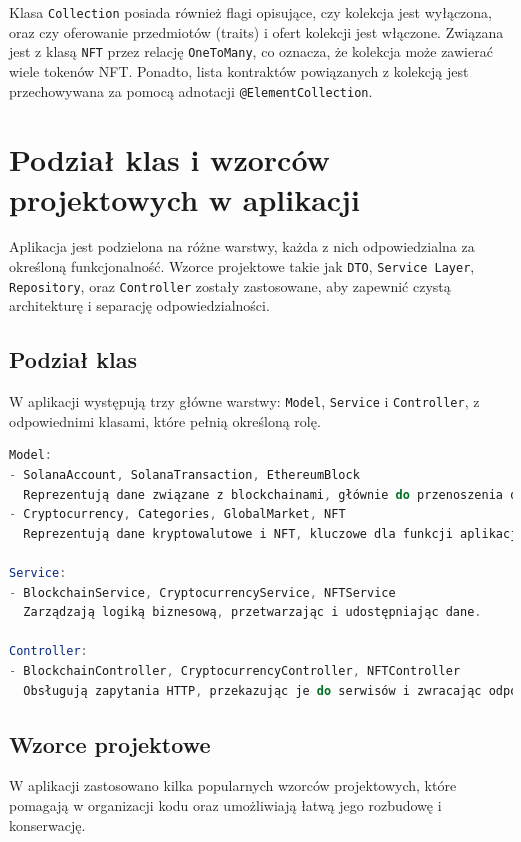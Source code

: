 Klasa \texttt{Collection} posiada również flagi opisujące, czy kolekcja jest wyłączona, oraz czy oferowanie przedmiotów (traits) i ofert kolekcji jest włączone. Związana jest z klasą \texttt{NFT} przez relację \texttt{OneToMany}, co oznacza, że kolekcja może zawierać wiele tokenów NFT. Ponadto, lista kontraktów powiązanych z kolekcją jest przechowywana za pomocą adnotacji \texttt{@ElementCollection}.

\section{Podział klas i wzorców projektowych w aplikacji}

Aplikacja jest podzielona na różne warstwy, każda z nich odpowiedzialna za określoną funkcjonalność. Wzorce projektowe takie jak \texttt{DTO}, \texttt{Service Layer}, \texttt{Repository}, oraz \texttt{Controller} zostały zastosowane, aby zapewnić czystą architekturę i separację odpowiedzialności.

\subsection{Podział klas}

W aplikacji występują trzy główne warstwy: \texttt{Model}, \texttt{Service} i \texttt{Controller}, z odpowiednimi klasami, które pełnią określoną rolę.

\begin{lstlisting}[language=Java, caption={Podział klas w aplikacji}]
Model:
- SolanaAccount, SolanaTransaction, EthereumBlock
  Reprezentują dane związane z blockchainami, głównie do przenoszenia danych.
- Cryptocurrency, Categories, GlobalMarket, NFT
  Reprezentują dane kryptowalutowe i NFT, kluczowe dla funkcji aplikacji.

Service:
- BlockchainService, CryptocurrencyService, NFTService
  Zarządzają logiką biznesową, przetwarzając i udostępniając dane.

Controller:
- BlockchainController, CryptocurrencyController, NFTController
  Obsługują zapytania HTTP, przekazując je do serwisów i zwracając odpowiedzi.
\end{lstlisting}


\subsection{Wzorce projektowe}

W aplikacji zastosowano kilka popularnych wzorców projektowych, które pomagają w organizacji kodu oraz umożliwiają łatwą jego rozbudowę i konserwację.

